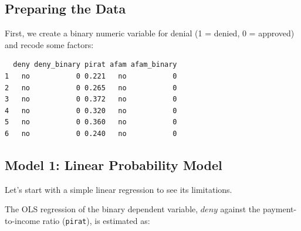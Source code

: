 \documentclass[
  12pt,
  letterpaper,
]{scrbook}
\newenvironment{Shaded}{\begin{snugshade}}{\end{snugshade}}
\newcommand{\CommentTok}[1]{\textcolor[rgb]{0.37,0.37,0.37}{#1}}
\newcommand{\DecValTok}[1]{\textcolor[rgb]{0.68,0.00,0.00}{#1}}
\newcommand{\FunctionTok}[1]{\textcolor[rgb]{0.28,0.35,0.67}{#1}}
\newcommand{\NormalTok}[1]{\textcolor[rgb]{0.00,0.23,0.31}{#1}}
\newcommand{\OtherTok}[1]{\textcolor[rgb]{0.00,0.23,0.31}{#1}}
\newcommand{\SpecialCharTok}[1]{\textcolor[rgb]{0.37,0.37,0.37}{#1}}
\newcommand{\StringTok}[1]{\textcolor[rgb]{0.13,0.47,0.30}{#1}}
\theoremstyle{plain}
\theoremstyle{definition}
\theoremstyle{remark}
\begin{document}
\subsection{Preparing the Data}\label{preparing-the-data}

First, we create a binary numeric variable for denial (1 = denied, 0 =
approved) and recode some factors:

\begin{Shaded}
\end{Shaded}

\begin{verbatim}
  deny deny_binary pirat afam afam_binary
1   no           0 0.221   no           0
2   no           0 0.265   no           0
3   no           0 0.372   no           0
4   no           0 0.320   no           0
5   no           0 0.360   no           0
6   no           0 0.240   no           0
\end{verbatim}

\subsection{Model 1: Linear Probability
Model}\label{model-1-linear-probability-model}

Let's start with a simple linear regression to see its limitations.

The OLS regression of the binary dependent variable, \(deny\) against
the payment-to-income ratio (\texttt{pirat}), is estimated as:
\end{document}
